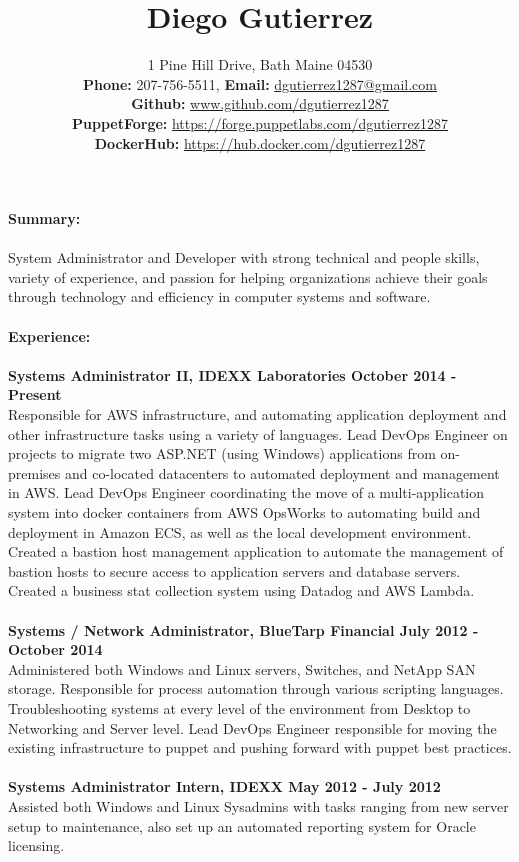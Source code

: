 \documentclass[10pt]{article}
\title{Diego Gutierrez}
\date{}
\author{%
	1 Pine Hill Drive, Bath Maine 04530\\
	\textbf{Phone:} 207-756-5511, \textbf{Email:} \underline{dgutierrez1287@gmail.com}\\
	\textbf{Github:} \tab\underline{www.github.com/dgutierrez1287}\\
	\textbf{PuppetForge:} \underline{https://forge.puppetlabs.com/dgutierrez1287}\\
	\textbf{DockerHub:} \space\space\underline{https://hub.docker.com/dgutierrez1287}
}
\makeatletter
\renewcommand{\maketitle}{\bgroup\setlength{\parindent}{0pt}
	\begin{flushleft}
		\LARGE\textbf{\@title}
		
		\normalsize\@author
	\end{flushleft}\egroup
}
\makeatother
\begin{document}
\maketitle
\thispagestyle{empty} %
\noindent\Large\textbf{Summary:}\\
\\
\normalsize System Administrator and Developer with strong technical and people skills, variety of experience, and passion for helping organizations achieve their goals through technology and efficiency in computer systems and software.
\\
\\
\noindent\Large\textbf{Experience:}\\
\\
\normalsize
\textbf{Systems Administrator II, IDEXX Laboratories \hfill{October 2014 - Present}}\\
\normalsize Responsible for AWS infrastructure, and automating application deployment and other infrastructure tasks using a variety of languages. Lead DevOps Engineer on projects to migrate two ASP.NET (using Windows) applications
from on-premises and co-located datacenters to automated deployment and management in AWS. Lead DevOps Engineer coordinating the move of a  multi-application system into docker containers from AWS OpsWorks to automating 
build and deployment in Amazon ECS, as well as the local development environment. Created a bastion host management application to automate the management of bastion hosts to secure access to application servers and database servers.
Created a business stat collection system using Datadog and AWS Lambda.
\\
\\
\textbf{Systems / Network Administrator, BlueTarp Financial \hfill{July 2012 - October 2014}}\\
\normalsize Administered both Windows and Linux servers, Switches, and NetApp SAN storage. Responsible for process automation through various scripting languages. Troubleshooting systems at every level of the
environment from Desktop to Networking and Server level. Lead DevOps Engineer responsible for moving the existing infrastructure to puppet and pushing forward with puppet best practices.
\\
\\
\textbf{Systems Administrator Intern, IDEXX \hfill{May 2012 - July 2012}}\\
\normalsize Assisted both Windows and Linux Sysadmins with tasks ranging from new server setup to maintenance, also set up an automated reporting system for Oracle licensing.
\end{document}
